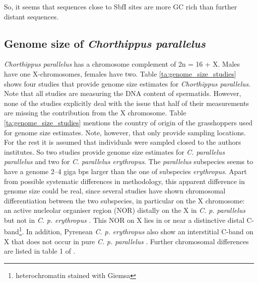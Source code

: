 \documentclass[a4paper,12pt,times,print,index,custombib,custommargin]{PhDThesisPSnPDF}\usepackage[]{graphicx}\usepackage[]{color}
\begin{document}
So, it seems that sequences close to \gls{SbfI} sites are more GC rich than further distant sequences. 

\FloatBarrier
\subsection{Genome size of \textit{Chorthippus parallelus}}\label{ch:Genome_size}

\textit{Chorthippus parallelus} has a chromosome complement of 2n = 16 + X. Males have one X-chromosomes, females have two. Table \ref{ta:genome_size_studies} shows four studies that provide genome size estimates for \textit{Chorthippus parallelus}. Note that all studies are measuring the DNA content of spermatids. However, none of the studies explicitly deal with the issue that half of their measurements are missing the contribution from the X chromosome. Table \ref{ta:genome_size_studies} mentions the country of origin of the grasshoppers used for genome size estimates. Note, however, that only \cite{Belda1991} provide sampling locations. For the rest it is assumed that individuals were sampled closed to the authors institutes. So two studies provide genome size estimates for \textit{C. parallelus parallelus} and two for \textit{C. parallelus erythropus}. The \textit{parallelus} subspecies seems to have a genome 2--4 giga \glspl{bp} larger than the one of subspecies \textit{erythropus}. Apart from possible systematic differences in methodology, this apparent difference in genome size could be real, since several studies have shown chromosomal differentiation between the two subspecies, in particular on the X chromosome: an active nucleolar organiser region (NOR) distally on the X in \textit{C. p. parallelus} but not in \textit{C. p. erythropus} \citep{Gosalvez1988}. This NOR on X lies in or near a distinctive distal C-band\footnote{\gls{heterochromatin} stained with Giemsa}. In addition, Pyrenean \textit{C. p. erythropus} also show an interstitial C-band on X that does not occur in pure \textit{C. p. parallelus} \citep{Bella2007}. Further chromosomal differences are listed in table 1 of \cite{Ferris1993}.
\end{document}
